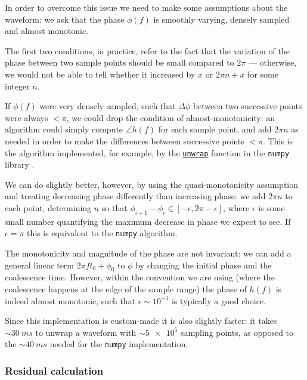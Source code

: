 \documentclass[main.tex]{subfiles}
\begin{document}
In order to overcome this issue we need to make some assumptions about the waveform: we ask that the phase \(\phi (f)\) is smoothly varying, densely sampled and almost monotonic. 

The first two conditions, in practice, refer to the fact that the variation of the phase between two sample points should be small compared to \(2 \pi \) --- otherwise, we would not be able to tell whether it increased by \(x\) or \(2 \pi n + x\) for some integer \(n\). 

If \(\phi (f)\) were very densely sampled, such that \(\Delta \phi \) between two successive points were always \(< \pi \), we could drop the condition of almost-monotonicity: an algorithm could simply compute \(\angle h(f)\) for each sample point, and add \(2 \pi n\) as needed in order to make the differences between successive points \(< \pi \). 
This is the algorithm implemented, for example, by the \href{https://numpy.org/doc/stable/reference/generated/numpy.unwrap.html}{\texttt{unwrap}} function in the \texttt{numpy} library \cite{harrisArrayProgrammingNumPy2020}.

We can do slightly better, however, by using the quasi-monotonicity assumption and treating decreasing phase differently than increasing phase: we add \(2 \pi n\) to each point, determining \(n\) so that \(\phi _{i+1} - \phi _i \in [- \epsilon , 2 \pi - \epsilon ]\), where \(\epsilon \) is some small number quantifying the maximum decrease in phase we expect to see.
If \(\epsilon = \pi \) this is equivalent to the \texttt{numpy} algorithm. 

The monotonicity and magnitude of the phase are not invariant: we can add a general linear term \(2 \pi f t_0 + \phi_0 \) to \(\phi \) by changing the initial phase and the coalescence time. 
However, within the convention we are using (where the coalescence happens at the edge of the sample range) the phase of \(h(f)\) is indeed almost monotonic, such that \(\epsilon \sim 10^{-1}\) is typically a good choice.

Since this implementation is custom-made it is also slightly faster: it takes \(\sim \SI{30}{ms}\) to unwrap a waveform with \(\sim \num{5e5}\) sampling points,  as opposed to the \(\sim \SI{40}{ms}\) needed for the \texttt{numpy} implementation. 

\subsubsection{Residual calculation} \label{sec:residuals}
\end{document}
